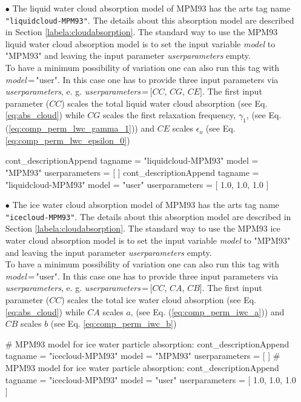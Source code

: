 \begin{itemize}
\item[$\bullet$] The liquid water cloud absorption model of 
     MPM93 \citep{liebeetal:93} has the arts tag name 
     {\tt "liquidcloud-MPM93"}. The details about this 
     absorption model are described in Section 
     \ref{labela:cloudabsorption}. The standard way to use 
     the MPM93 liquid water cloud absorption model is to set 
     the input variable {\it model} to "MPM93" and leaving 
     the input parameter {\it userparameters} empty. \\ To 
     have a minimum possibility of variation one can also run 
     this tag with {\it model}\,=\,"user". In this case one 
     has to provide three input parameters via {\it userparameters}, 
     e. g. {\it userparameters}\,=\,$[CC$, $CG$, $CE]$. The first 
     input parameter ($CC$) scales the total liquid water cloud absorption 
     (see Eq. \ref{eq:abs_cloud}) while $CG$ scales the first 
     relaxation frequency, $\gamma_1$, (see Eq. 
     (\ref{eq:comp_perm_lwc_gamma_1})) and  $CE$ scales $\epsilon_o$ 
     (see Eq. \ref{eq:comp_perm_lwc_epsilon_0})
\begin{code}
cont_descriptionAppend{
    tagname        = "liquidcloud-MPM93"
    model          = "MPM93"
    userparameters = [ ]
}
cont_descriptionAppend{
    tagname        = "liquidcloud-MPM93"
    model          = "user"
    userparameters = [ 1.0, 1.0, 1.0 ]
}
\end{code}
\item[$\bullet$] The ice water cloud absorption model of 
     MPM93 \citep{liebeetal:93} has the arts tag name 
     {\tt "icecloud-MPM93"}. The details about this 
     absorption model are described in Section 
     \ref{labela:cloudabsorption}. The standard way to use 
     the MPM93 ice water cloud absorption model is to set 
     the input variable {\it model} to "MPM93" and leaving 
     the input parameter {\it userparameters} empty. \\ To 
     have a minimum possibility of variation one can also run 
     this tag with {\it model}\,=\,"user". In this case one 
     has to provide three input parameters via {\it userparameters}, 
     e. g. {\it userparameters}\,=\,$[CC$, $CA$, $CB]$. The first 
     input parameter ($CC$) scales the total ice water cloud absorption 
     (see Eq. \ref{eq:abs_cloud}) while $CA$ scales $a$, (see Eq. 
     (\ref{eq:comp_perm_iwc_a})) and $CB$ scales $b$ 
     (see Eq. \ref{eq:comp_perm_iwc_b})
\begin{code}
# MPM93 model for ice water particle absorption:
cont_descriptionAppend{
    tagname        = "icecloud-MPM93"
    model          = "MPM93"
    userparameters = [ ]
}
# MPM93 model for ice water particle absorption:
cont_descriptionAppend{
    tagname        = "icecloud-MPM93"
    model          = "user"
    userparameters = [ 1.0, 1.0, 1.0 ]
}
\end{code}
\end{itemize}


